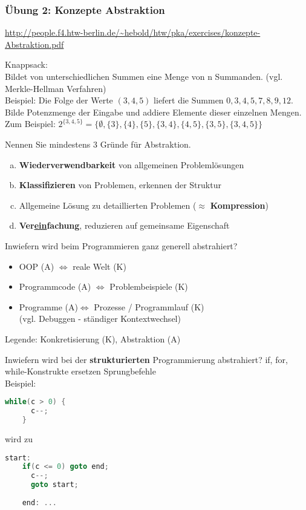 \begin{card}
	\frametitle{Übung 2: Konzepte Abstraktion}
	\url{http://people.f4.htw-berlin.de/~hebold/htw/pka/exercises/konzepte-Abstraktion.pdf}
\end{card}

\begin{card}
	Knappsack:\\
	Bildet von unterschiedlichen Summen eine Menge von n Summanden. (vgl. Merkle-Hellman Verfahren)\\
	Beispiel: Die Folge der Werte $( 3, 4, 5 )$ liefert die Summen $0, 3, 4, 5, 7, 8, 9, 12$.
	\hr
	Bilde Potenzmenge der Eingabe und addiere Elemente dieser einzelnen Mengen.\\
	Zum Beispiel: $2^{\{ 3, 4, 5 \}} = \{\emptyset, \{3\}, \{4\}, \{5\}, \{3,4\}, \{4,5\}, \{3,5\}, \{3,4,5\} \}$
\end{card}

\begin{card}
	Nennen Sie mindestens 3 Gründe für Abstraktion.
	\hr
	\begin{enumerate}[a)]
	\item \textbf{Wiederverwendbarkeit} von allgemeinen Problemlösungen
	\item \textbf{Klassifizieren} von Problemen, erkennen der Struktur
	\item Allgemeine Lösung zu detaillierten Problemen ($\approx$ \textbf{Kompression})
	\item \textbf{Ver\uline{ein}fachung}, reduzieren auf gemeinsame Eigenschaft
	\end{enumerate}
\end{card}

\begin{card}
	Inwiefern wird beim Programmieren ganz generell abstrahiert?
	\hr
	\begin{itemize}
	\item OOP (A) $\Leftrightarrow$ reale Welt (K)
	\item Programmcode (A) $\Leftrightarrow$ Problembeispiele (K)
	\item Programme (A)$\Leftrightarrow$ Prozesse / Programmlauf (K)\\(vgl. Debuggen - ständiger Kontextwechsel)
	\end{itemize}
	Legende: Konkretisierung (K), Abstraktion (A)
\end{card}

\begin{card}
	Inwiefern wird bei der \textbf{strukturierten} Programmierung abstrahiert?
	\hr
	if, for, while-Konstrukte ersetzen Sprungbefehle\\
	Beispiel: 
	\begin{lstlisting}[language=C]
	while(c > 0) {
	  c--;
	}
	\end{lstlisting}
	wird zu 
	\begin{lstlisting}[language=C]
	start:
	if(c <= 0) goto end;
	  c--;
	  goto start;
	
	end: ...
	\end{lstlisting}
\end{card}


